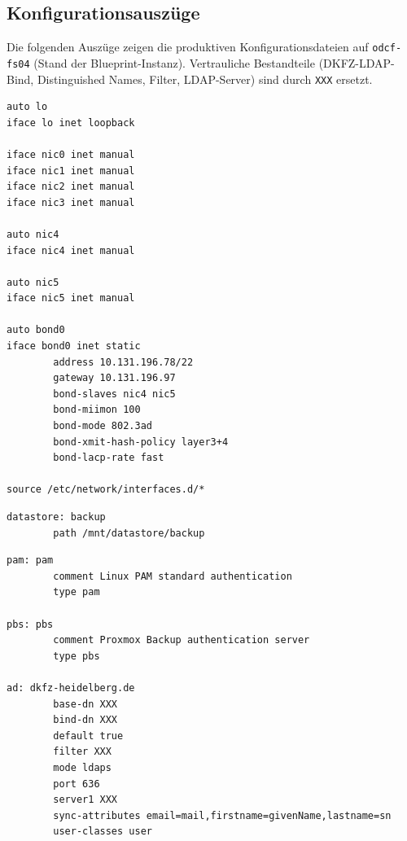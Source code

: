 \clearpage
\subsection{Konfigurationsauszüge}
\label{app:Listings}
Die folgenden Auszüge zeigen die produktiven Konfigurations\-dateien
auf \texttt{odcf-fs04} (Stand der Blueprint-Instanz). Vertrauliche
Bestandteile (DKFZ-LDAP-Bind, Distinguished Names, Filter,
LDAP-Server) sind durch \texttt{XXX} ersetzt.

\begin{lstlisting}[caption={\texttt{/etc/network/interfaces} -- LACP-Bond aus 2$\times$10\,GbE},label=lst:interfaces]
auto lo
iface lo inet loopback

iface nic0 inet manual
iface nic1 inet manual
iface nic2 inet manual
iface nic3 inet manual

auto nic4
iface nic4 inet manual

auto nic5
iface nic5 inet manual

auto bond0
iface bond0 inet static
        address 10.131.196.78/22
        gateway 10.131.196.97
        bond-slaves nic4 nic5
        bond-miimon 100
        bond-mode 802.3ad
        bond-xmit-hash-policy layer3+4
        bond-lacp-rate fast

source /etc/network/interfaces.d/*
\end{lstlisting}
\clearpage

\begin{lstlisting}[caption={\texttt{/etc/proxmox-backup/datastore.cfg}},label=lst:datastore]
datastore: backup
        path /mnt/datastore/backup
\end{lstlisting}
\clearpage

\begin{lstlisting}[caption={\texttt{/etc/proxmox-backup/domains.cfg} (DKFZ-spezifische Daten geschwärzt)},label=lst:ldap]
pam: pam
        comment Linux PAM standard authentication
        type pam

pbs: pbs
        comment Proxmox Backup authentication server
        type pbs

ad: dkfz-heidelberg.de
        base-dn XXX
        bind-dn XXX
        default true
        filter XXX
        mode ldaps
        port 636
        server1 XXX
        sync-attributes email=mail,firstname=givenName,lastname=sn
        user-classes user
\end{lstlisting}
